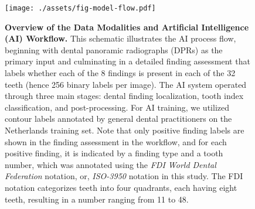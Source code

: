 \begin{figure}[!t]
    \centering
    \texttt{[image: ./assets/fig-model-flow.pdf]}
    \caption{
        \textbf{Overview of the Data Modalities and Artificial Intelligence (AI) Workflow.}
        This schematic illustrates the AI process flow, beginning with dental panoramic radiographs (DPRs) as the primary input and culminating in a detailed finding assessment that labels whether each of the 8 findings is present in each of the 32 teeth (hence 256 binary labels per image).
        The AI system operated through three main stages: dental finding localization, tooth index classification, and post-processing.
        For AI training, we utilized contour labels annotated by general dental practitioners on the Netherlands training set.
        Note that only positive finding labels are shown in the finding assessment in the workflow, and for each positive finding, it is indicated by a finding type and a tooth number, which was annotated using the \emph{FDI World Dental Federation} notation, or, \emph{ISO-3950} notation in this study.
        The FDI notation categorizes teeth into four quadrants, each having eight teeth, resulting in a number ranging from 11 to 48.
    }
    \label{fig:model-flow}
\end{figure}